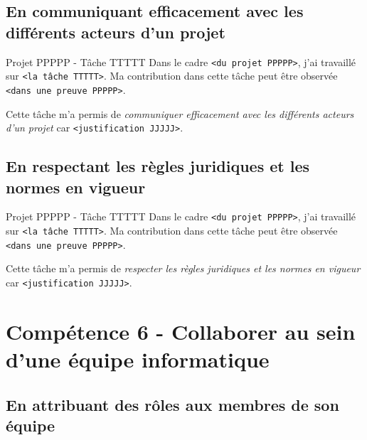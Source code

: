 \documentclass[%
    10pt,%
    usenames,%
    dvipsnames%
]{beamer}
\begin{document}
\subsection{En communiquant efficacement avec les différents acteurs
d'un
projet}\label{en-communiquant-efficacement-avec-les-diffuxe9rents-acteurs-dun-projet}

\begin{frame}[fragile]{Projet PPPPP - Tâche TTTTT}
\label{projet-ppppp---tuxe2che-ttttt-17}
Dans le cadre \texttt{\textless{}du\ projet\ PPPPP\textgreater{}}, j'ai
travaillé sur \texttt{\textless{}la\ tâche\ TTTTT\textgreater{}}. Ma
contribution dans cette tâche peut être observée
\texttt{\textless{}dans\ une\ preuve\ PPPPP\textgreater{}}.

Cette tâche m'a permis de \emph{communiquer efficacement avec les
différents acteurs d'un projet} car
\texttt{\textless{}justification\ JJJJJ\textgreater{}}.
\end{frame}

\subsection{En respectant les règles juridiques et les normes en
vigueur}\label{en-respectant-les-ruxe8gles-juridiques-et-les-normes-en-vigueur}

\begin{frame}[fragile]{Projet PPPPP - Tâche TTTTT}
\label{projet-ppppp---tuxe2che-ttttt-18}
Dans le cadre \texttt{\textless{}du\ projet\ PPPPP\textgreater{}}, j'ai
travaillé sur \texttt{\textless{}la\ tâche\ TTTTT\textgreater{}}. Ma
contribution dans cette tâche peut être observée
\texttt{\textless{}dans\ une\ preuve\ PPPPP\textgreater{}}.

Cette tâche m'a permis de \emph{respecter les règles juridiques et les
normes en vigueur} car
\texttt{\textless{}justification\ JJJJJ\textgreater{}}.
\end{frame}

\section{Compétence 6 - Collaborer au sein d'une équipe
informatique}\label{compuxe9tence-6---collaborer-au-sein-dune-uxe9quipe-informatique}

\subsection{En attribuant des rôles aux membres de son
équipe}\label{en-attribuant-des-ruxf4les-aux-membres-de-son-uxe9quipe}
\end{document}
